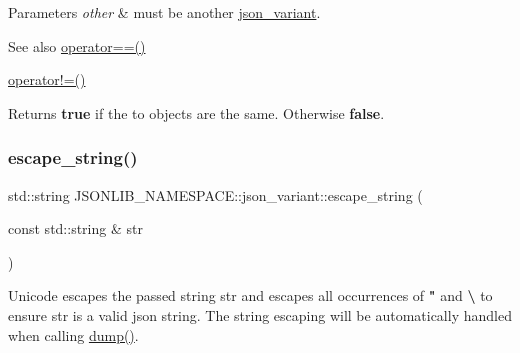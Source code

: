 \begin{DoxyParams}{Parameters}
{\em other} & must be another \hyperlink{classJSONLIB__NAMESPACE_1_1json__variant}{json\+\_\+variant}. \\
\hline
\end{DoxyParams}
\begin{DoxySeeAlso}{See also}
\hyperlink{classJSONLIB__NAMESPACE_1_1json__variant_aef1fc1a342cc170da06e0d3eb1299aad}{operator==()} 

\hyperlink{classJSONLIB__NAMESPACE_1_1json__variant_a7672a255983f3142523b3680e737d021}{operator!=()} 
\end{DoxySeeAlso}
\begin{DoxyReturn}{Returns}
{\bfseries true} if the to objects are the same. Otherwise {\bfseries false}. 
\end{DoxyReturn}
\mbox{\label{classJSONLIB__NAMESPACE_1_1json__variant_a4c2354098f97b91b5a07dbda981673cf}} 
\subsubsection{\texorpdfstring{escape\+\_\+string()}{escape\_string()}\hspace{0.1cm}{\footnotesize\ttfamily [1/2]}}
{\footnotesize\ttfamily std\+::string J\+S\+O\+N\+L\+I\+B\+\_\+\+N\+A\+M\+E\+S\+P\+A\+C\+E\+::json\+\_\+variant\+::escape\+\_\+string (\begin{DoxyParamCaption}\item[{const std\+::string \&}]{str }\end{DoxyParamCaption})\hspace{0.3cm}{\ttfamily [static]}}



Unicode escapes the passed string {\ttfamily str} and escapes all occurrences of {\bfseries "} and {\bfseries \textbackslash{}} to ensure {\ttfamily str} is a valid json string. The string escaping will be automatically handled when calling \hyperlink{classJSONLIB__NAMESPACE_1_1json__variant_a72d4a39d77b76f076354219edc6ea4a0}{dump()}. 

